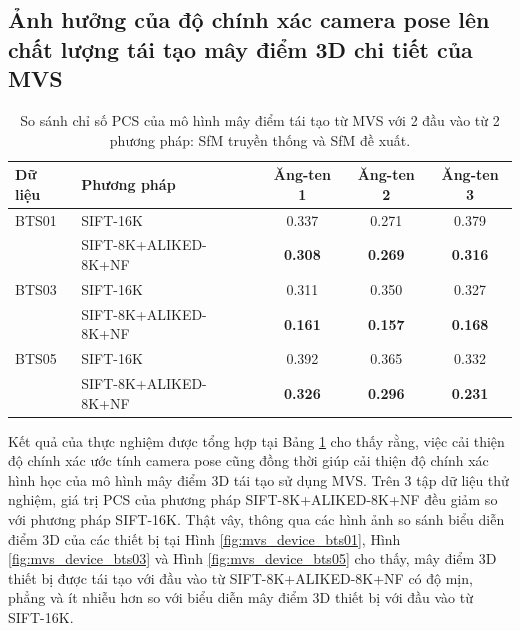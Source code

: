     \subsection{Ảnh hưởng của độ chính xác camera pose lên chất lượng tái tạo mây điểm 3D chi tiết của MVS}
    \label{subsec:eval_mvs_impact}
        \begin{table}[H]
            \centering
            \footnotesize
            \begin{tabular}{|l|l|c|c|c|}
            \hline
            \textbf{Dữ liệu} & \textbf{Phương pháp} & \textbf{Ăng-ten 1} & \textbf{Ăng-ten 2} & \textbf{Ăng-ten 3} \\
            \hline
            BTS01 & SIFT-16K & 0.337 & 0.271 & 0.379 \\
                  & SIFT-8K+ALIKED-8K+NF & \textbf{0.308} & \textbf{0.269} & \textbf{0.316} \\
            \hline
            BTS03 & SIFT-16K & 0.311 & 0.350 & 0.327 \\
                  & SIFT-8K+ALIKED-8K+NF & \textbf{0.161} & \textbf{0.157} & \textbf{0.168} \\
            \hline
            BTS05 & SIFT-16K & 0.392 & 0.365 & 0.332 \\
                  & SIFT-8K+ALIKED-8K+NF & \textbf{0.326} & \textbf{0.296} & \textbf{0.231}\\
            \hline
            \end{tabular}
            \caption{So sánh chỉ số PCS của mô hình mây điểm tái tạo từ MVS với 2 đầu vào từ 2 phương pháp: SfM truyền thống và SfM đề xuất.}
            \label{tab:Smoothness_comparison_mvs}
        \end{table}
    Kết quả của thực nghiệm được tổng hợp tại Bảng \ref{tab:Smoothness_comparison_mvs} cho thấy rằng, việc cải thiện độ chính xác ước tính camera pose cũng đồng thời giúp cải thiện độ chính xác hình học của mô hình mây điểm 3D tái tạo sử dụng MVS. Trên 3 tập dữ liệu thử nghiệm, giá trị PCS của phương pháp SIFT-8K+ALIKED-8K+NF đều giảm so với phương pháp SIFT-16K. Thật vây, thông qua các hình ảnh so sánh biểu diễn điểm 3D của các thiết bị tại Hình \ref{fig:mvs_device_bts01}, Hình \ref{fig:mvs_device_bts03} và Hình \ref{fig:mvs_device_bts05} cho thấy, mây điểm 3D thiết bị được tái tạo với đầu vào từ SIFT-8K+ALIKED-8K+NF có độ mịn, phẳng và ít nhiễu hơn so với biểu diễn mây điểm 3D thiết bị với đầu vào từ SIFT-16K.
    
